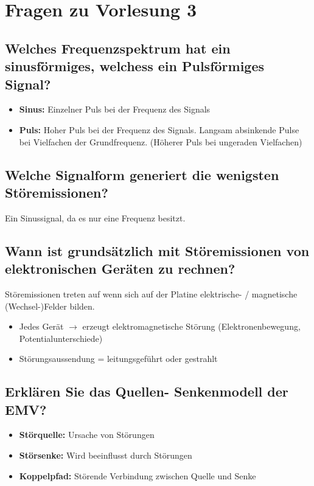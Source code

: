 \section{Fragen zu Vorlesung 3}

\subsection{Welches Frequenzspektrum hat ein sinusförmiges, welchess ein Pulsförmiges Signal?}
\begin{itemize}
  \item \textbf{Sinus:} Einzelner Puls bei der Frequenz des Signals
  \item \textbf{Puls:} Hoher Puls bei der Frequenz des Signals. Langsam absinkende Pulse bei Vielfachen der Grundfrequenz. (Höherer Puls bei ungeraden Vielfachen)
\end{itemize}

\subsection{Welche Signalform generiert die wenigsten Störemissionen?}
Ein Sinussignal, da es nur eine Frequenz besitzt.

\subsection{Wann ist grundsätzlich mit Störemissionen von elektronischen Geräten zu rechnen?}

Störemissionen treten auf wenn sich auf der Platine elektrische- / magnetische (Wechsel-)Felder bilden.

\begin{itemize}
  \item Jedes Gerät \(\rightarrow\) erzeugt elektromagnetische Störung (Elektronenbewegung, Potentialunterschiede)
  \item Störungsaussendung = leitungsgeführt oder gestrahlt
\end{itemize}

\subsection{Erklären Sie das Quellen- Senkenmodell der EMV?}

\begin{itemize}
  \item \textbf{Störquelle:} Ursache von Störungen
  \item \textbf{Störsenke:} Wird beeinflusst durch Störungen
  \item \textbf{Koppelpfad:} Störende Verbindung zwischen Quelle und Senke
\end{itemize}

